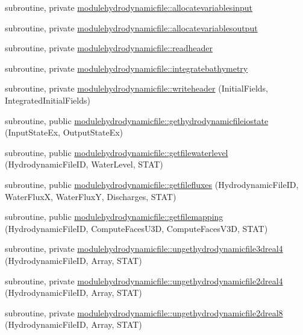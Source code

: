 \begin{DoxyCompactItemize}
subroutine, private \mbox{\hyperlink{namespacemodulehydrodynamicfile_ac67e9023c973dadd99ed3b893b1cc9ad}{modulehydrodynamicfile\+::allocatevariablesinput}}
\item 
subroutine, private \mbox{\hyperlink{namespacemodulehydrodynamicfile_a395d8802270df14831dc0865064f36c1}{modulehydrodynamicfile\+::allocatevariablesoutput}}
\item 
subroutine, private \mbox{\hyperlink{namespacemodulehydrodynamicfile_a6d9975e28fbe49117eab154fe46cdeca}{modulehydrodynamicfile\+::readheader}}
\item 
subroutine, private \mbox{\hyperlink{namespacemodulehydrodynamicfile_ae3afcd841fecf4aa1c250de0db5419e7}{modulehydrodynamicfile\+::integratebathymetry}}
\item 
subroutine, private \mbox{\hyperlink{namespacemodulehydrodynamicfile_ad777d9126fa56a82299811343a399ea8}{modulehydrodynamicfile\+::writeheader}} (Initial\+Fields, Integrated\+Initial\+Fields)
\item 
subroutine, public \mbox{\hyperlink{namespacemodulehydrodynamicfile_a8095cd04310d0ed954d72fb7021c5141}{modulehydrodynamicfile\+::gethydrodynamicfileiostate}} (Input\+State\+Ex, Output\+State\+Ex)
\item 
subroutine, public \mbox{\hyperlink{namespacemodulehydrodynamicfile_af996537253af14e50e63530e5814f6bb}{modulehydrodynamicfile\+::getfilewaterlevel}} (Hydrodynamic\+File\+ID, Water\+Level, S\+T\+AT)
\item 
subroutine, public \mbox{\hyperlink{namespacemodulehydrodynamicfile_a59c8f54e1b85d7dc3765167672866ffb}{modulehydrodynamicfile\+::getfilefluxes}} (Hydrodynamic\+File\+ID, Water\+FluxX, Water\+FluxY, Discharges, S\+T\+AT)
\item 
subroutine, public \mbox{\hyperlink{namespacemodulehydrodynamicfile_a9b237b5496d01afbf9b2c35f1ed0745c}{modulehydrodynamicfile\+::getfilemapping}} (Hydrodynamic\+File\+ID, Compute\+Faces\+U3D, Compute\+Faces\+V3D, S\+T\+AT)
\item 
subroutine, private \mbox{\hyperlink{namespacemodulehydrodynamicfile_a56a478bf1d00b0e9a1ea2795005d1b01}{modulehydrodynamicfile\+::ungethydrodynamicfile3dreal4}} (Hydrodynamic\+File\+ID, Array, S\+T\+AT)
\item 
subroutine, private \mbox{\hyperlink{namespacemodulehydrodynamicfile_a7f6d7c818b2355e29070b78957b71133}{modulehydrodynamicfile\+::ungethydrodynamicfile2dreal4}} (Hydrodynamic\+File\+ID, Array, S\+T\+AT)
\item 
subroutine, private \mbox{\hyperlink{namespacemodulehydrodynamicfile_a419f36beda63ccf38170844806ddd74c}{modulehydrodynamicfile\+::ungethydrodynamicfile2dreal8}} (Hydrodynamic\+File\+ID, Array, S\+T\+AT)

\end{DoxyCompactItemize}
